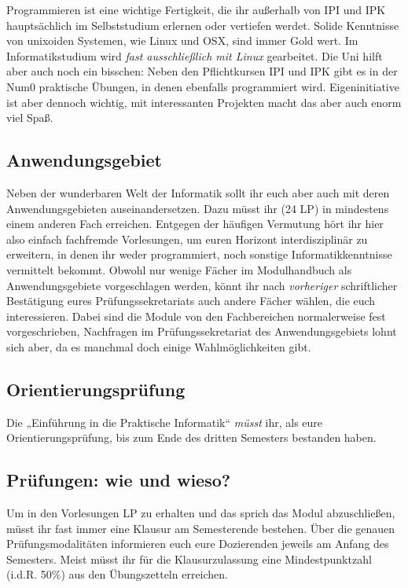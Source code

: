 Programmieren ist eine wichtige Fertigkeit, die ihr außerhalb von IPI und IPK hauptsächlich im Selbststudium erlernen oder vertiefen werdet. Solide Kenntnisse von unixoiden Systemen, wie Linux und OSX, sind immer Gold wert. Im Informatikstudium wird \emph{fast ausschließlich mit Linux} gearbeitet. Die Uni hilft aber auch noch ein bisschen: Neben den Pflichtkursen IPI und IPK gibt es in der Num0 praktische Übungen, in denen ebenfalls programmiert wird. Eigeninitiative ist aber dennoch wichtig, mit interessanten Projekten macht das aber auch enorm viel Spaß.


\subsection{Anwendungsgebiet}

Neben der wunderbaren Welt der Informatik sollt ihr euch aber auch mit deren Anwendungsgebieten auseinandersetzen. Dazu müsst ihr (24 \gls{LP}) in mindestens einem anderen Fach erreichen. Entgegen der häufigen Vermutung hört ihr hier also einfach fachfremde Vorlesungen, um euren Horizont interdisziplinär zu erweitern, in denen ihr weder programmiert, noch sonstige Informatikkenntnisse vermittelt bekommt. Obwohl nur wenige Fächer im Modulhandbuch als Anwendungsgebiete vorgeschlagen werden, könnt ihr nach \emph{vorheriger} schriftlicher Bestätigung eures Prüfungssekretariats auch andere Fächer wählen, die euch interessieren. Dabei sind die Module von den Fachbereichen normalerweise fest vorgeschrieben, Nachfragen im Prüfungssekretariat des Anwendungsgebiets lohnt sich aber, da es manchmal doch einige Wahlmöglichkeiten gibt.


\subsection{Orientierungsprüfung}

Die „Einführung in die Praktische Informatik“ \emph{müsst} ihr, als eure Orientierungsprüfung, bis zum Ende des dritten Semesters bestanden haben.


\subsection{Prüfungen: wie und wieso?}

Um in den Vorlesungen \gls{LP} zu erhalten und das sprich das Modul abzuschließen, müsst ihr fast immer eine Klausur am Semesterende bestehen. Über die genauen Prüfungsmodalitäten informieren euch eure Dozierenden jeweils am Anfang des Semesters. Meist müsst ihr für die Klausurzulassung eine Mindestpunktzahl (i.d.R. 50\%) aus den Übungszetteln erreichen.

